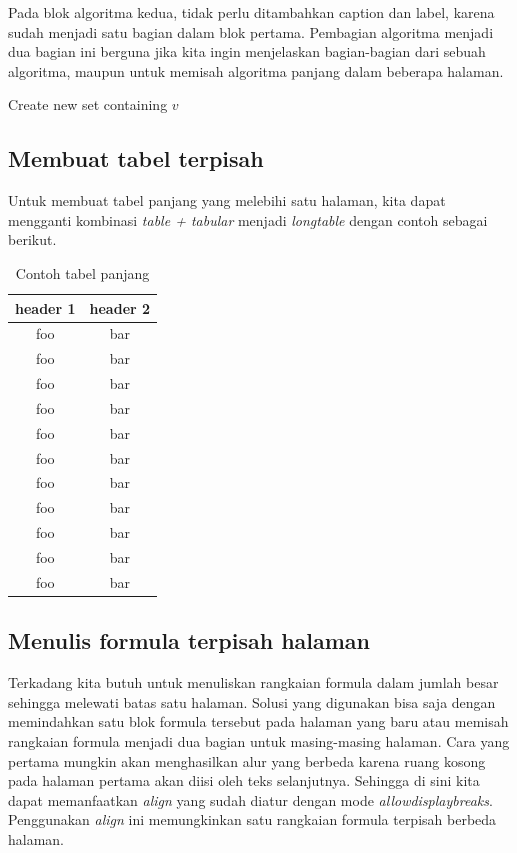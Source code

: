 Pada blok algoritma kedua, tidak perlu ditambahkan caption dan label, karena sudah menjadi satu bagian dalam blok pertama. Pembagian algoritma menjadi dua bagian ini berguna jika kita ingin menjelaskan bagian-bagian dari sebuah algoritma, maupun untuk memisah algoritma panjang dalam beberapa halaman.

\begin{algorithm}                     
	\begin{algorithmic} [1]                   
		\State Create new set containing $v$
		\EndProcedure
	\end{algorithmic}
\end{algorithm}


\subsection{Membuat tabel terpisah}

Untuk membuat tabel panjang yang melebihi satu halaman, kita dapat mengganti kombinasi \textit{table + tabular} menjadi \textit{longtable} dengan contoh sebagai berikut.

\begin{longtable}{| c | c |} 
	\caption{Contoh tabel panjang}
	\label{tab:myfirstlongtable} \\
	\hline
	header 1 & header 2 \\
	\hline \hline
	foo & bar \\ \hline 
	foo & bar \\ \hline
	foo & bar \\ \hline
	foo & bar \\ \hline
	foo & bar \\ \hline
	foo & bar \\ \hline
	foo & bar \\ \hline
	foo & bar \\ \hline
	foo & bar \\ \hline
	foo & bar \\ \hline
	foo & bar \\ \hline
\end{longtable}


\subsection{Menulis formula terpisah halaman}

Terkadang kita butuh untuk menuliskan rangkaian formula dalam jumlah besar sehingga melewati batas satu halaman. Solusi yang digunakan bisa saja dengan memindahkan satu blok formula tersebut pada halaman yang baru atau memisah rangkaian formula menjadi dua bagian untuk masing-masing halaman. Cara yang pertama mungkin akan menghasilkan alur yang berbeda karena ruang kosong pada halaman pertama akan diisi oleh teks selanjutnya. Sehingga di sini kita dapat memanfaatkan \textit{align} yang sudah diatur dengan mode \textit{allowdisplaybreaks}. Penggunakan \textit{align} ini memungkinkan satu rangkaian formula terpisah berbeda halaman. 

